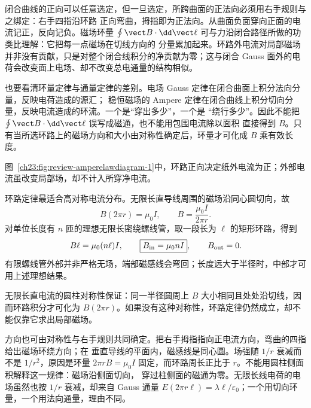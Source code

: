 闭合曲线的正向可以任意选定，但一旦选定，所跨曲面的正法向必须用右手规则与之绑定：右手四指沿环路
正向弯曲，拇指即为正法向。从曲面负面穿向正面的电流记正，反向记负。磁场环量
$\oint\vect B\cdot\dd\vect\ell$ 可与力沿闭合路径所做的功类比理解：它把每一点磁场在切线方向的
分量累加起来。环路外电流对局部磁场并非没有贡献，只是对整个闭合线积分的净贡献为零；这与闭合
Gauss 面外的电荷会改变面上电场、却不改变总电通量的结构相似。

也要看清环量定律与通量定律的差别。电场 Gauss 定律在闭合曲面上积分法向分量，反映电荷造成的源汇；
稳恒磁场的 Ampere 定律在闭合曲线上积分切向分量，反映电流造成的环流。一个是“穿出多少”，一个是
“绕行多少”。因此不能把 $\oint\vect B\cdot\dd\vect\ell$ 误写成磁通，也不能用包围电流除以面积
直接得到 $B$。只有当所选环路上的磁场方向和大小由对称性确定后，环量才可化成 $B$ 乘有效长度。

图~\ref{ch23:fig:review-amperelawdiagram-1}中，环路正向决定纸外电流为正；外部电流虽改变局部场，却不计入所穿净电流。
\par\noindent\begin{minipage}{\linewidth}
\ampereLawDiagram
{}\label{ch23:fig:review-amperelawdiagram-1}
\end{minipage}\par\medskip

环路定律最适合高对称电流分布。无限长直导线周围的磁场沿同心圆切向，故
\begin{equation}
  B(2\pi r)=\mu_0I,
  \qquad
  \boxed{B=\frac{\mu_0I}{2\pi r}}.
\end{equation}
对单位长度有 $n$ 匝的理想无限长密绕螺线管，取一段长为 $\ell$ 的矩形环路，得到
\begin{equation}
  B\ell=\mu_0(n\ell)I,
  \qquad
  \boxed{B_{\rm in}=\mu_0nI},
  \qquad B_{\rm out}=0.
\end{equation}
有限螺线管外部并非严格无场，端部磁感线会弯回；长度远大于半径时，中部才可用上述理想结果。

无限长直电流的圆柱对称性保证：同一半径圆周上 $B$ 大小相同且处处沿切线，因而环路积分才可化为
$B(2\pi r)$。如果没有这种对称性，环路定律仍然成立，却不能仅靠它求出局部磁场。

方向也可由对称性与右手规则共同确定。把右手拇指指向正电流方向，弯曲的四指给出磁场环绕方向；在
垂直导线的平面内，磁感线是同心圆。场强随 $1/r$ 衰减而不是 $1/r^2$，原因是环量
$2\pi rB=\mu_0I$ 固定，而环路周长正比于 $r$。不能用圆柱侧面积解释这一规律：磁场沿侧面切向，
穿过柱侧面的磁通为零。无限长线电荷的电场虽然也按 $1/r$ 衰减，却来自 Gauss 通量
$E(2\pi r\ell)=\lambda\ell/\varepsilon_0$；一个用切向环量，一个用法向通量，理由不同。


